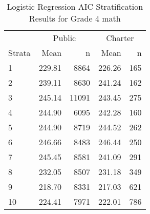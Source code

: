 \begin{table}[ht]
\centering
\caption{Logistic Regression AIC Stratification Results for Grade 4 math} 
\label{g4math-circpsa10AIC}
\begin{tabular}{lrr@{\extracolsep{.2cm}}rr}
  \hline
   & \multicolumn{2}{c}{Public} & \multicolumn{2}{c}{Charter} \\ \cline{2-3} \cline{4-5} Strata & Mean & n & Mean & n \\ \hline
1 & 229.81 & 8864 & 226.26 & 165 \\ 
  2 & 239.11 & 8630 & 241.24 & 162 \\ 
  3 & 245.14 & 11091 & 243.45 & 275 \\ 
  4 & 244.90 & 6095 & 242.28 & 160 \\ 
  5 & 244.90 & 8719 & 244.52 & 262 \\ 
  6 & 246.66 & 8483 & 246.44 & 250 \\ 
  7 & 245.45 & 8581 & 241.09 & 291 \\ 
  8 & 232.05 & 8507 & 231.18 & 349 \\ 
  9 & 218.70 & 8331 & 217.03 & 621 \\ 
  10 & 224.41 & 7971 & 222.01 & 786 \\ 
   \hline
\end{tabular}
\end{table}
